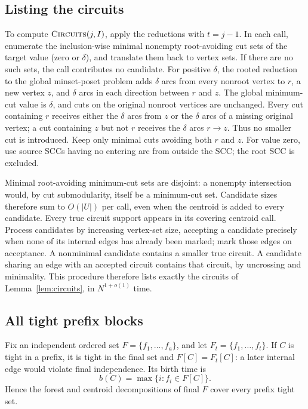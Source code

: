 \documentclass[11pt,a4paper]{article}
\theoremstyle{definition}
\theoremstyle{remark}
\newcommand{\Circuits}{\textsc{Circuits}}
\newcommand{\birth}{b}
\begin{document}
\subsection{Listing the circuits}

To compute $\Circuits(j,I)$, apply the reductions with $t=j-1$.
In each call, enumerate the inclusion-wise minimal nonempty
root-avoiding cut sets of the target value (zero or $\delta$),
and translate them back to vertex sets. If there are no such
sets, the call contributes no candidate.
For positive $\delta$, the rooted reduction to the global
minset-poset problem adds $\delta$ arcs from every nonroot
vertex to $r$, a new vertex $z$, and $\delta$ arcs in each
direction between $r$ and $z$. The global minimum-cut value
is $\delta$, and cuts on the original nonroot vertices are unchanged.
Every cut containing $r$ receives either the $\delta$ arcs from $z$
or the $\delta$ arcs of a missing original vertex; a cut containing
$z$ but not $r$ receives the $\delta$ arcs $r\to z$.
Thus no smaller cut is introduced. Keep only minimal cuts avoiding
both $r$ and $z$. For value zero, use source SCCs having no entering
arc from outside the SCC; the root SCC is excluded.

Minimal root-avoiding minimum-cut sets are disjoint: a nonempty
intersection would, by cut submodularity, itself be a
minimum-cut set. Candidate sizes therefore sum to $O(|U|)$
per call, even when the centroid is added to every candidate.
Every true circuit support appears in its covering centroid
call. Process candidates by increasing vertex-set size,
accepting a candidate precisely when none of its internal
edges has already been marked; mark those edges on acceptance.
A nonminimal candidate contains a smaller true circuit.
A candidate sharing an edge with an accepted circuit contains
that circuit, by uncrossing and minimality. This procedure
therefore lists exactly the circuits of
Lemma~\ref{lem:circuits}, in $N^{1+o(1)}$ time.

\subsection{All tight prefix blocks}

Fix an independent ordered set $F=\{f_1,\ldots,f_a\}$, and let
$F_t=\{f_1,\ldots,f_t\}$. If $C$ is tight in a prefix, it is
tight in the final set and $F[C]=F_t[C]$: a later internal
edge would violate final independence. Its birth time is
\[
 \birth(C)=\max\{i:f_i\in F[C]\}.
\]
Hence the forest and centroid decompositions of final $F$
cover every prefix tight set.
\end{document}
